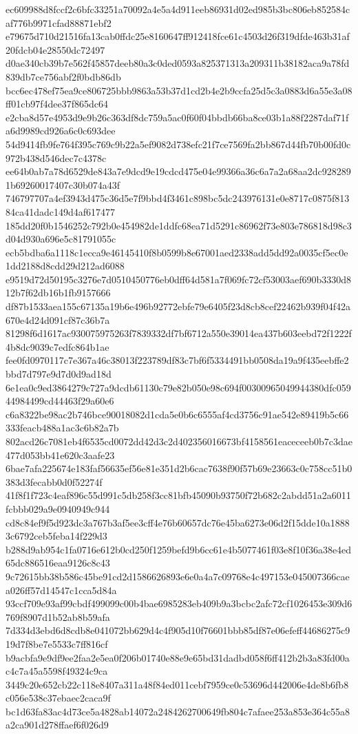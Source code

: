 {ec609988d8fccf2c6bfc33251a70092a4e5a4d911eeb86931d02ed985b3bc806eb852584caf776b9971cfad88871ebf2
e79675d710d21516fa13cab0ffdc25e8160647ff912418fce61c4503d26f319dfde463b31af20fdcb04e28550dc72497
d0ae340cb39b7e562f45857deeb80a3c0ded0593a825371313a209311b38182aca9a78fd839db7ce756abf2f0bdb86db
bcc6ec478ef75ea9ce806725bbb9863a53b37d1cd2b4e2b9ccfa25d5c3a0883d6a55e3a08ff01cb97f4dee37f865dc64
e2cba8d57e4953d9e9b26c363df8dc759a5ac0f60f04bbdb66ba8ce03b1a88f2287daf71fa6d9989cd926a6c0c693dee
54d9414fb9fe764f395c769c9b22a5ef9082d738efc21f7ce7569fa2bb867d44fb70b00fd0c972b438d546dec7c4378c
ee64b0ab7a78d6529de843a7e9dcd9e19cdcd475e04e99366a36c6a7a2a68aa2dc9282891b69260017407c30b074a43f
746797707a4ef3943d475c36d5e7f9bbd4f3461c898bc5dc243976131e0e8717c0875f81384ca41dadc149d4af617477
185dd20f0b1546252c792b0e454982de1ddfc68ea71d5291c86962f73e803e786818d98c3d04d930a696e5c81791055c
ecb5bdba6a1118c1ecca9e46145410f8b0599b8e67001aed2338add5dd92a0035cf5ec0e1dd2188d8cdd29d212ad6088
e9519d72d50195c3276e7d0510450776eb0dff64d581a7f069fc72cf53003aef690b3330d812b7f62db16b1fb9157666
df87b1533aea155c67135a19b6e496b92772ebfe79e6405f23d8cb8cef22462b939f04f42a670e4d24d091cf87c36b7a
81298f6d1617ac930075975263f7839332df7bf6712a550e39014ea437b603eebd72f1222f4b8dc9039c7edfc864b1ae
fee0fd0970117c7e367a46c38013f223789df83c7bf6f5334491bb0508da19a9f435eebffe2bbd7d797e9d7d0d9ad18d
6e1ea0c9ed3864279c727a9dcdb61130c79e82b050e98c694f00300965049944380dfc05944984499cd44463f29a60e6
c6a8322be98ac2b746bce90018082d1cda5e0b6c6555af4cd3756c91ae542e89419b5c66333feacb488a1ac3c6b82a7b
802acd26c7081eb4f6535cd0072dd42d3c2d402356016673bf4158561eaceceeb0b7c3dae477d053bb41e620c3aafe23
6bae7afa225674e183faf56635ef56e81e351d2b6cac7638f90f57b69e23663c0c758cc51b0383d3fecabb0d0f52274f
41f8f1f723c4eaf896c55d991c5db258f3cc81bfb45090b93750f72b682c2abdd51a2a6011fcbbb029a9e0940949c944
cd8c84ef9f5d923dc3a767b3af5ee3cff4e76b60657dc76e45ba6273e06d2f15dde10a18883c6792ceb5feba14f229d3
b288d9ab954c1fa0716e612b0cd250f1259befd9b6cc61e4b5077461f03e8f10f36a38e4ed65dc886516eaa9126c8c43
9c72615bb38b586c45be91cd2d1586626893e6e0a4a7c09768e4c497153e045007366caea026ff57d14547c1cca5d84a
93ccf709e93af99cbdf499099c00b4bae6985283eb409b9a3bcbc2afc72cf1026453e309d6769f8907d1b52ab8b59afa
7d334d3ebd6d8cdb8e041072bb629d4c4f905d10f76601bbb85df87e06efeff44686275c919d7f8be7e5533c7ff816cf
b9acbfa9e9df9ee2faa2e5ea0f206b01740e88e9e65bd31dadbd058f6ff412b2b3a83fd00ac4c7a45a5598f49324c9ca
3449c20e652cb22c118e8407a311a48f84ed011cebf7959ce0c53696d442006e4de8b6fb8c056e538c37ebaec2caca9f
bc1d63fa83ac4d73ce5a4828ab14072a2484262700649fb804c7afaee253a853e364c55a8a2ca901d278ffaef6f026d9
}
